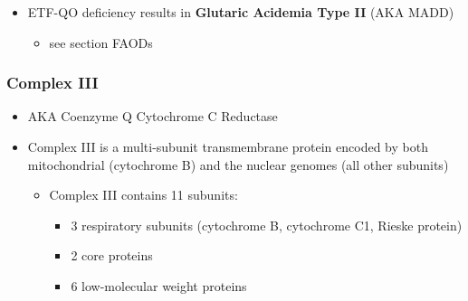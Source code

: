 \documentclass[12pt]{scrartcl}
\begin{document}
{\small{}}

\begin{itemize}
\item ETF-QO deficiency results in \textbf{Glutaric Acidemia Type II} (AKA MADD)
\begin{itemize}
\item see section FAODs
\end{itemize}
\end{itemize}
\subsubsection{Complex III}
\label{sec:org350290e}
\begin{itemize}
\item AKA Coenzyme Q Cytochrome C Reductase
\item Complex III is a multi-subunit transmembrane protein encoded by both
mitochondrial (cytochrome B) and the nuclear genomes (all other
subunits)

\begin{itemize}
\item Complex III contains 11 subunits:
\begin{itemize}
\item 3 respiratory subunits (cytochrome B, cytochrome C1, Rieske protein)
\item 2 core proteins
\item 6 low-molecular weight proteins
\end{itemize}
\end{itemize}

{\small{}}
\end{itemize}
\end{document}
